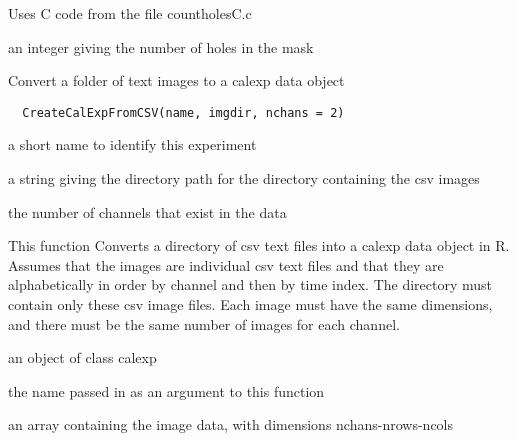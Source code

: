 \documentclass[a4paper]{book}
\begin{document}
%
\begin{Details}\relax
Uses C code from the file countholesC.c
\end{Details}
%
\begin{Value}
an integer giving the number of holes in the mask
\end{Value}
%
\begin{Description}\relax
Convert a folder of text images to a calexp data object
\end{Description}
%
\begin{Usage}
\begin{verbatim}
  CreateCalExpFromCSV(name, imgdir, nchans = 2)
\end{verbatim}
\end{Usage}
%
\begin{Arguments}
\begin{ldescription}
\item[\code{name}] a short name to identify this experiment

\item[\code{imgdir}] a string giving the directory path for the
directory containing the csv images

\item[\code{nchans}] the number of channels that exist in the
data
\end{ldescription}
\end{Arguments}
%
\begin{Details}\relax
This function Converts a directory of csv text files into
a calexp data object in R. Assumes that the images are
individual csv text files and that they are
alphabetically in order by channel and then by time
index.  The directory must contain only these csv image
files. Each image must have the same dimensions, and
there must be the same number of images for each channel.
\end{Details}
%
\begin{Value}
an object of class calexp \begin{ldescription}
\item[\code{name}] the name passed in
as an argument to this function\item[\code{data}] an array
containing the image data, with dimensions
nchans-nrows-ncols
\end{ldescription}
\end{Value}
\end{document}
